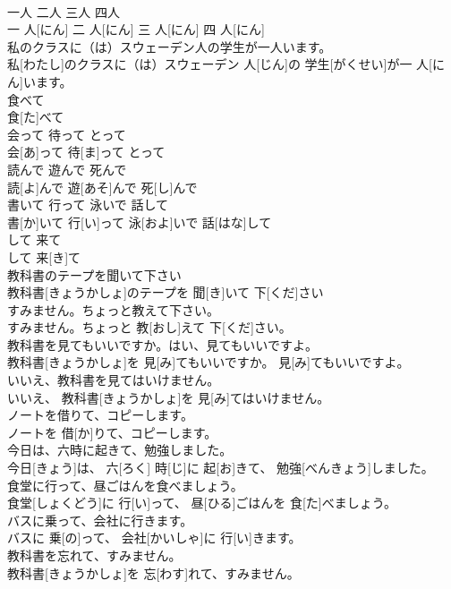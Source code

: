 \documentclass[8pt]{extreport}
\begin{document}
\begin{CJK}{UTF8}{min}
\\	一人 二人 三人 四人	
\\	一 人[にん] 二 人[にん] 三 人[にん] 四 人[にん]	
\\	私のクラスに（は）スウェーデン人の学生が一人います。	
\\	私[わたし]のクラスに（は）スウェーデン 人[じん]の 学生[がくせい]が一 人[にん]います。	
\\	食べて	
\\	食[た]べて	
\\	会って 待って とって	
\\	会[あ]って 待[ま]って とって	
\\	読んで 遊んで 死んで	
\\	読[よ]んで 遊[あそ]んで 死[し]んで	
\\	書いて 行って 泳いで 話して	
\\	書[か]いて 行[い]って 泳[およ]いで 話[はな]して	
\\	して 来て	
\\	して 来[き]て	
\\	教科書のテープを聞いて下さい	
\\	教科書[きょうかしょ]のテープを 聞[き]いて 下[くだ]さい	
\\	すみません。ちょっと教えて下さい。	
\\	すみません。ちょっと 教[おし]えて 下[くだ]さい。	
\\	教科書を見てもいいですか。はい、見てもいいですよ。	
\\	教科書[きょうかしょ]を 見[み]てもいいですか。 見[み]てもいいですよ。	
\\	いいえ、教科書を見てはいけません。	
\\	いいえ、 教科書[きょうかしょ]を 見[み]てはいけません。	
\\	ノートを借りて、コピーします。	
\\	ノートを 借[か]りて、コピーします。	
\\	今日は、六時に起きて、勉強しました。	
\\	今日[きょう]は、 六[ろく] 時[じ]に 起[お]きて、 勉強[べんきょう]しました。	
\\	食堂に行って、昼ごはんを食べましょう。	
\\	食堂[しょくどう]に 行[い]って、 昼[ひる]ごはんを 食[た]べましょう。	
\\	バスに乗って、会社に行きます。	
\\	バスに 乗[の]って、 会社[かいしゃ]に 行[い]きます。	
\\	教科書を忘れて、すみません。	
\\	教科書[きょうかしょ]を 忘[わす]れて、すみません。	

\end{CJK}
\end{document}
